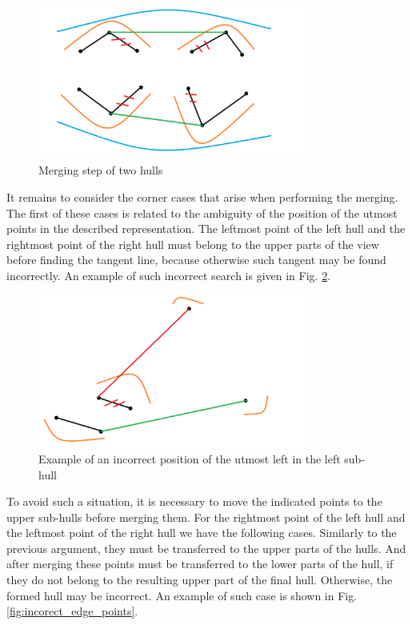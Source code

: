 \documentclass[a4paper,UKenglish,cleveref, autoref]{socg-lipics-v2019}
\begin{document}
	\begin{figure}[t]
		\centering
		\includegraphics[width=0.8\textwidth, height=0.3\textheight]{ch_union}
		\caption{Merging step of two hulls}
		\label{fig:ch_union}
	\end{figure}
	
	It remains to consider the corner cases that arise when performing the merging. The first of these cases is related to the ambiguity of the position of the utmost points in the described representation. The leftmost point of the left hull and the rightmost point of the right hull must belong to the upper parts of the view before finding the tangent line, because otherwise such tangent may be found incorrectly. An example of such incorrect search is given in Fig. \ref{fig:incorect_search}.
	
	\begin{figure}[t]
		\centering
		\includegraphics[width=0.8\textwidth, height=0.3\textheight]{incorect_search}
		\caption{Example of an incorrect position of the utmost left in the left sub-hull}
		\label{fig:incorect_search}
	\end{figure}
	
	To avoid such a situation, it is necessary to move the indicated points to the upper sub-hulls before merging them. For the rightmost point of the left hull and the leftmost point of the right hull we have the following cases. Similarly to the previous argument, they must be transferred to the upper parts of the hulls. And after merging these points must be transferred to the lower parts of the hull, if they do not belong to the resulting upper part of the final hull. Otherwise, the formed hull may be incorrect. An example of such case is shown in Fig. \ref{fig:incorect_edge_points}.
	
\end{document}

